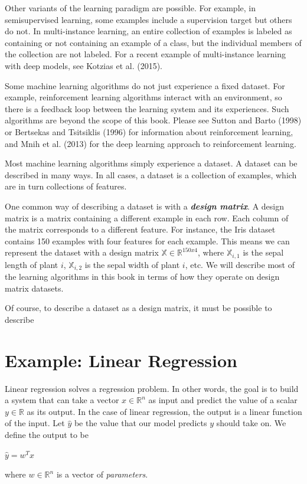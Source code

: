 \documentclass{report}
\begin{document}
\noindent Other variants of the learning paradigm are possible. For example, in semisupervised learning, some examples include a supervision target but others do not. In multi-instance learning, an entire collection of examples is labeled as containing or not containing an example of a class, but the individual members of the collection are not labeled. For a recent example of multi-instance learning with deep models, see Kotzias et al. (2015).\newline

\noindent Some machine learning algorithms do not just experience a fixed dataset. For example, reinforcement learning algorithms interact with an environment, so there is a feedback loop between the learning system and its experiences. Such algorithms are beyond the scope of this book. Please see Sutton and Barto (1998) or Bertsekas and Tsitsiklis (1996) for information about reinforcement learning, and Mnih et al. (2013) for the deep learning approach to reinforcement learning.\newline

\noindent Most machine learning algorithms simply experience a dataset. A dataset can be described in many ways. In all cases, a dataset is a collection of examples, which are in turn collections of features.\newline

\noindent One common way of describing a dataset is with a \textbf{\textit{design matrix}}. A design matrix is a matrix containing a different example in each row. Each column of the matrix corresponds to a different feature. For instance, the Iris dataset contains 150 examples with four features for each example. This means we can represent the dataset with a design matrix $\mathbb{X} \in \mathbb{R}^{150x4}$, where $\mathbb{X}_{i,1}$ is the sepal length of plant $i$, $\mathbb{X}_{i,2}$ is the sepal width of plant $i$, etc. We will describe most of the learning algorithms in this book in terms of how they operate on design matrix datasets.\newline

\noindent Of course, to describe a dataset as a design matrix, it must be possible to describe 



\section{Example: Linear Regression}
Linear regression solves a regression problem. In other words, the goal is to build a system that can take a vector $x \in \mathbb{R}^n$ as input and predict the value of a scalar $y \in \mathbb{R}$ as its output. In the case of linear regression, the output is a linear function of the input. Let $\hat{y}$ be the value that our model predicts $y$ should take on. We define the output to be\newline
    \centerline{$\hat{y}= w^T x $}\newline
where $w \in \mathbb{R}^n$ is a vector of \textit{parameters}.\newline
\end{document}
